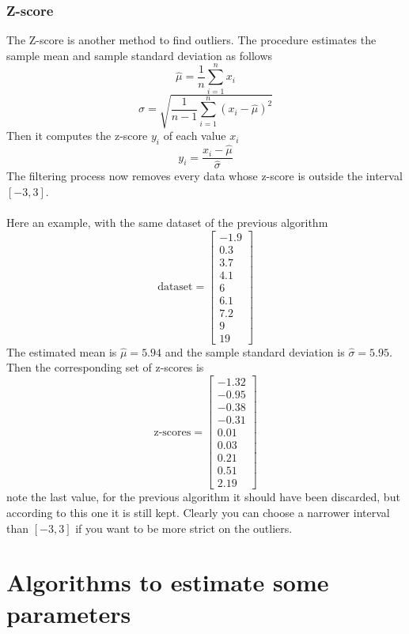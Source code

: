 \documentclass[12pt,twoside]{report}
\begin{document}
\subsection{Z-score}
The Z-score is another method to find outliers. The procedure estimates the sample mean and sample standard deviation as follows
\begin{equation}
    \hat{\mu}=\frac{1}{n}\sum_{i=1}^nx_i
\end{equation}
\begin{equation}
    \hat{\sigma}=\sqrt{\frac{1}{n-1}\sum_{i=1}^n(x_i-\hat{\mu})^2}
\end{equation}
Then it computes the z-score $y_i$ of each value $x_i$
\begin{equation}
    y_i=\frac{x_i-\hat{\mu}}{\hat{\sigma}}
\end{equation}
The filtering process now removes every data whose z-score is outside the interval $[-3,3]$. \\\\
Here an example, with the same dataset of the previous algorithm
$$
\text{dataset}=\begin{bmatrix}
-1.9\\ 
0.3\\ 
3.7\\
4.1\\
6\\
6.1\\
7.2\\
9\\
19
\end{bmatrix}
$$
The estimated mean is $\hat{\mu}=5.94$ and the sample standard deviation is $\hat{\sigma}=5.95$. Then the corresponding set of z-scores is
$$
\text{z-scores}=\begin{bmatrix}
-1.32\\
-0.95\\
-0.38\\
-0.31\\
0.01\\
0.03\\
0.21\\
0.51\\
2.19
\end{bmatrix}
$$
note the last value, for the previous algorithm it should have been discarded, but according to this one it is still kept. Clearly you can choose a narrower interval than $[-3,3]$ if you want to be more strict on the outliers.

\clearpage

\chapter{Algorithms to estimate some parameters}
\end{document}
